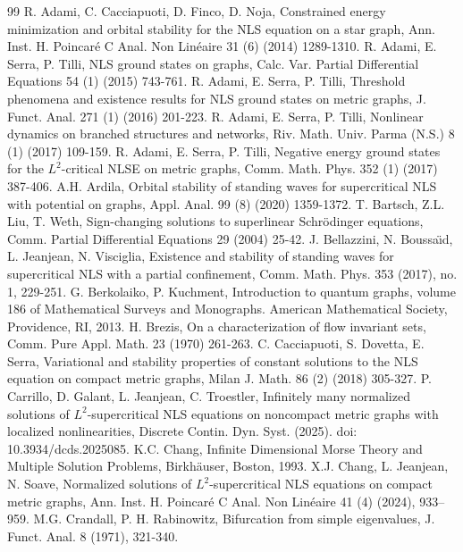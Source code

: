 \documentclass[10pt,a4paper]{article}
\theoremstyle{definition} \theoremstyle{remark}
\numberwithin{equation}{section}
\begin{document}
\begin{thebibliography}{99}
	  R. Adami, C. Cacciapuoti, D. Finco, D. Noja, Constrained energy minimization and orbital
	stability for the NLS equation on a star graph, Ann. Inst. H. Poincar\'e C Anal. Non Lin\'eaire 31 (6)
	(2014) 1289-1310.
	  R. Adami, E. Serra, P. Tilli, NLS ground states on graphs, Calc. Var. Partial Differential Equations 54 (1) (2015) 743-761.
	  R. Adami, E. Serra, P. Tilli, Threshold phenomena and existence results for NLS ground states on metric graphs, J. Funct. Anal. 271 (1) (2016) 201-223.
	  R. Adami, E. Serra, P. Tilli, Nonlinear dynamics on branched structures and networks, Riv.
	Math. Univ. Parma (N.S.) 8 (1) (2017) 109-159.
	  R. Adami, E. Serra, P. Tilli, Negative energy ground states for the $L^2$-critical NLSE on
	metric graphs, Comm. Math. Phys. 352 (1) (2017) 387-406.
	  A.H. Ardila, Orbital stability of standing waves for supercritical NLS with potential on graphs, Appl. Anal. 99 (8) (2020) 1359-1372.
	  T. Bartsch, Z.L. Liu, T. Weth, Sign-changing solutions to superlinear Schr\"odinger equations, Comm. Partial Differential Equations 29 (2004) 25-42.
	  J. Bellazzini, N. Boussa\"{\i}d, L. Jeanjean, N. Visciglia, Existence and stability of standing waves for supercritical NLS with a partial confinement, Comm. Math. Phys. 353  (2017), no. 1, 229-251.
	  G. Berkolaiko, P. Kuchment, Introduction to quantum graphs, volume 186 of Mathematical Surveys and Monographs. American Mathematical Society, Providence, RI, 2013.
	  H. Brezis, On a characterization of flow invariant sets, Comm. Pure Appl. Math. 23 (1970) 261-263.
	  C. Cacciapuoti, S. Dovetta, E. Serra, Variational and stability properties of constant solutions to the NLS equation on compact metric graphs, Milan J. Math. 86 (2) (2018) 305-327.
	  P. Carrillo, D. Galant, L. Jeanjean, C. Troestler, Infinitely many normalized solutions of $L^2$-supercritical NLS equations on noncompact metric graphs with localized nonlinearities, Discrete Contin. Dyn. Syst. (2025). doi: 10.3934/dcds.2025085.
	  K.C. Chang, Infinite Dimensional Morse Theory and Multiple Solution Problems, Birkh\"auser, Boston, 1993.
	 X.J. Chang, L. Jeanjean, N. Soave, Normalized solutions of $L^2$-supercritical NLS equations on compact metric graphs, Ann. Inst. H. Poincar\'e C Anal. Non Linéaire 41 (4) (2024), 933–959.
	 M.G. Crandall, P. H. Rabinowitz, Bifurcation from simple eigenvalues, J. Funct. Anal. 8 (1971), 321-340.

\end{thebibliography}
\end{document}
